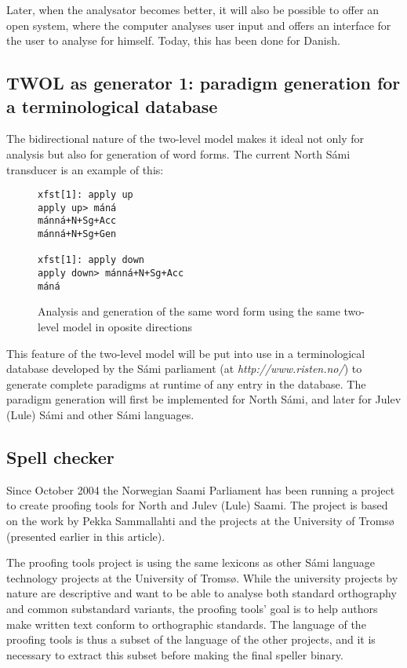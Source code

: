 \documentclass[a4paper,english]{article}
\begin{document}
Later, when the analysator becomes better, it will also be possible to offer an open system, where the computer analyses user input and offers an interface for the user to analyse for himself. Today, this has been done for Danish.

\subsection{TWOL as generator 1: paradigm generation for a terminological database}\label{term}

The bidirectional nature of the two-level model makes it ideal not only for analysis but also for generation of word forms. The current North Sámi transducer is an example of this:

\begin{figure}[htdp]
\caption{Analysis and generation of the same word form using the same two-level model in oposite directions}
\begin{center}
\begin{verbatim}
xfst[1]: apply up
apply up> máná
mánná+N+Sg+Acc
mánná+N+Sg+Gen

xfst[1]: apply down
apply down> mánná+N+Sg+Acc
máná
\end{verbatim}
\end{center}
\label{anagen}
\end{figure}%

This feature of the two-level model will be put into use in a terminological database developed by the Sámi parliament (at \textit{http://www.risten.no/}) to generate complete paradigms at runtime of any entry in the database. The paradigm generation will first be implemented for North Sámi, and later for Julev (Lule) Sámi and other Sámi languages.

\subsection{Spell checker}\label{spell}

Since October 2004 the Norwegian Saami Parliament has been running a project to create proofing tools for North and Julev (Lule) Saami. The project is based on the work by Pekka Sammallahti and the projects at the University of Tromsø (presented earlier in this article).

The proofing tools project is using the same lexicons as other Sámi language technology projects at the University of Tromsø. While the university projects by nature are descriptive and want to be able to analyse both standard orthography and common substandard variants, the proofing tools' goal is to help authors make written text conform to orthographic standards. The language of the proofing tools is thus a subset of the language of the other projects, and it is necessary to extract this subset before making the final speller binary.
\end{document}
